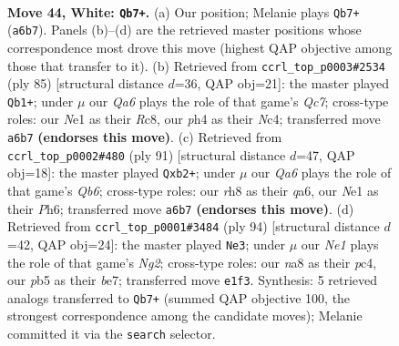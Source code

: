 \documentclass[11pt]{article}
\begin{document}
\clearpage

\begin{figure}[p]\centering
\begin{subfigure}{0.46\textwidth}\centering
\resizebox{\linewidth}{!}{%
\newchessgame
\chessboard[
  setfen={n6r/7k/Q7/1p6/6bp/P2P4/7K/4Nq2 w - - 2 44},
  showmover=false,
  pgfstyle=straightmove, color=movearrow, markmove={a6-b7}
]}
\caption{}
\end{subfigure}\hfill
\begin{subfigure}{0.46\textwidth}\centering
\resizebox{\linewidth}{!}{%
\newchessgame
\chessboard[
  setfen={2r4k/3Q1p2/8/4p3/2n5/1NP2PR1/2q5/6K1 b - - 1 43},
  showmover=false,
  pgfstyle=straightmove, color=movearrow, markmove={c2-b1}
]}
\caption{}
\end{subfigure}
\\[4pt]
\begin{subfigure}{0.46\textwidth}\centering
\resizebox{\linewidth}{!}{%
\newchessgame
\chessboard[
  setfen={5k2/8/Q6p/3n4/5p2/Pq3N1P/1P3K2/8 b - - 1 46},
  showmover=false,
  pgfstyle=straightmove, color=movearrow, markmove={b3-b2}
]}
\caption{}
\end{subfigure}\hfill
\begin{subfigure}{0.46\textwidth}\centering
\resizebox{\linewidth}{!}{%
\newchessgame
\chessboard[
  setfen={8/4b2p/8/4k3/2p4P/5q2/3Q1PNK/8 w - - 0 48},
  showmover=false,
  pgfstyle=straightmove, color=movearrow, markmove={g2-e3}
]}
\caption{}
\end{subfigure}
\caption{\textbf{Move 44, White: \texttt{Qb7+}.} (a) Our position; Melanie plays \texttt{Qb7+} (\texttt{a6b7}). Panels (b)--(d) are the retrieved master positions whose correspondence most drove this move (highest QAP objective among those that transfer to it). (b) Retrieved from \texttt{ccrl\_top\_p0003\#2534} (ply 85) [structural distance $d$=36, QAP obj=21]: the master played \texttt{Qb1+}; under $\mu$ our \emph{Qa6} plays the role of that game's \emph{Qc7}; cross-type roles: our \emph{N}e1 as their \emph{R}c8, our \emph{p}h4 as their \emph{N}c4; transferred move \texttt{a6b7} \textbf{(endorses this move)}. (c) Retrieved from \texttt{ccrl\_top\_p0002\#480} (ply 91) [structural distance $d$=47, QAP obj=18]: the master played \texttt{Qxb2+}; under $\mu$ our \emph{Qa6} plays the role of that game's \emph{Qb6}; cross-type roles: our \emph{r}h8 as their \emph{q}a6, our \emph{N}e1 as their \emph{P}h6; transferred move \texttt{a6b7} \textbf{(endorses this move)}. (d) Retrieved from \texttt{ccrl\_top\_p0001\#3484} (ply 94) [structural distance $d$=42, QAP obj=24]: the master played \texttt{Ne3}; under $\mu$ our \emph{Ne1} plays the role of that game's \emph{Ng2}; cross-type roles: our \emph{n}a8 as their \emph{p}c4, our \emph{p}b5 as their \emph{b}e7; transferred move \texttt{e1f3}. Synthesis: 5 retrieved analogs transferred to \texttt{Qb7+} (summed QAP objective 100, the strongest correspondence among the candidate moves); Melanie committed it via the \texttt{search} selector.}
\label{fig:thought-m86}
\end{figure}
\end{document}
